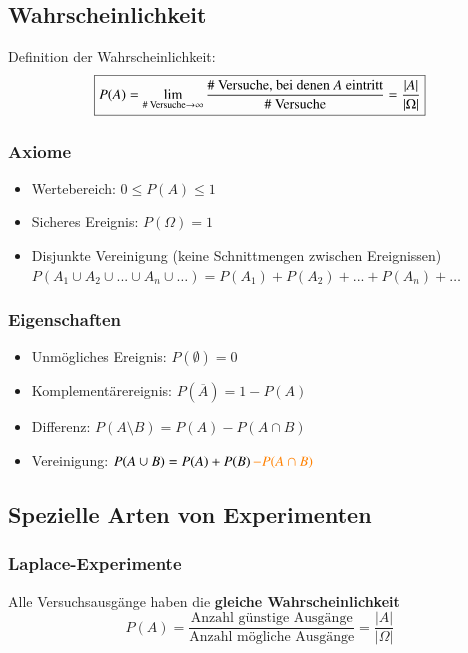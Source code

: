 \subsection{Wahrscheinlichkeit}

Definition der Wahrscheinlichkeit:
$$ \boxed{ P(A) = \lim\limits_{\text{\# Versuche} \to \infty} \frac{\text{\# Versuche, bei denen $A$ eintritt}}{\text{\# Versuche}}  = \frac{\left|A\right|}{\left|\Omega\right|}} $$


\subsubsection{Axiome}

\begin{itemize}
	\item Wertebereich: $0 \leq P(A) \leq 1$ 
	\item Sicheres Ereignis: $P(\Omega) = 1$ 
	\item Disjunkte Vereinigung (keine Schnittmengen zwischen Ereignissen)\\
	$P(A_1 \cup A_2\cup ... \cup A_n \cup \dots) =  P(A_1) + P(A_2) + ... + P(A_n) + \dots$ 
\end{itemize}


\subsubsection{Eigenschaften}

\begin{itemize}
	\item Unmögliches Ereignis: $P(\emptyset) = 0$ 
	\item Komplementärereignis: $P(\overline{A}) = 1 - P(A)$
	\item Differenz: $P(A \setminus B) = P(A) - P(A \cap B)$
	\item Vereinigung: $P(A \cup B) = P(A) + P(B) \, {\color{orange}- P(A \cap B)}$
\end{itemize}


\subsection{Spezielle Arten von Experimenten}

\subsubsection{Laplace-Experimente}

Alle Versuchsausgänge haben die \textbf{gleiche Wahrscheinlichkeit} 
$$ \boxed{ P(A) = \frac{\text{Anzahl günstige Ausgänge}}{\text{Anzahl mögliche Ausgänge}} = \frac{\vert A \vert}{\vert \Omega \vert} }$$

